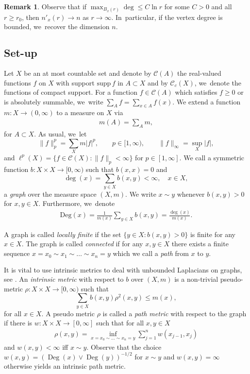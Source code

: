 \documentclass[JEP,XML,SOM,Unicode,published]{cedram}
\theoremstyle{plain}
\theoremstyle{definition}
\newtheorem*{remark}{Remark}
\newcommand{\cC}{\mathcal{C}}
\DeclareMathOperator{\Deg}{Deg}
\begin{document}
\begin{remark}
Observe that if $\max_{B_x(r)}\deg\leq C\ln r$ for some $C>0$ and all $r\geq r_0$, then $n'_x(r)\to n$ as $r\to\infty$. In~particular, if the vertex degree is bounded, we~recover the dimension $n$.
\end{remark}

\subsection{Set-up}\label{subsec:setup}

Let $X$ be an at most countable set and denote by $ \mathcal{C}(A) $ the real-valued functions $ f $ on $ X $ with support $ \mathrm{supp}\, f $ in $ A \subset X $ and by $ \mathcal{C}_{c}(X) $, we~denote the functions of compact support. {For a function $ f\in \mathcal{C}(A) $ which satisfies $ f\ge 0 $ or is absolutely summable, we~write $ \sum_{A}f=\sum_{x\in A}f(x) $.}
We extend a function
$m\colon X\to(0,\infty)$ to a measure on $X$ via \begin{align*}
m(A)=\sum_{A}m,
\end{align*} for $A\subset X$. {As usual, we~let
\[
\|f\|_p^p= {\sum_{X}m|f|^p},\qquad p\in[1,\infty),\qquad \|f\|_\infty=\sup_X|f|,
\]
and $\ell^p(X)=\{f\in \cC(X)\colon \|f\|_p<\infty\}$ for $p\in[1,\infty]$.}
We call a symmetric function $b\colon X\times X\to [0,\infty)$ such that $b(x,x)=0$ and
\[
\deg(x)=\sum_{y\in X}b(x,y)<\infty, \quad x\in X,
\]
a \emph{graph} over the measure space $(X,m)$. {We write $ x\sim y $ whenever $ b(x,y)>0 $ for $ x,y\in X $.} Furthermore, we~denote
\begin{align*}
\mathrm{Deg}(x)=\frac{1}{m(x)}\sum_{y\in X}b(x,y)=\frac{\deg(x)}{m(x)}.
\end{align*}

A graph is called \emph{locally finite} if the set $\{y\in X\colon b(x,y)>0\}$ is finite for any $x\in X$. The graph is called \emph{connected} if for any $x,y\in X$ there exists a finite sequence {$x=x_0\sim x_1\sim \ldots\sim x_n=y$ which we call a \emph{path} from $ x $ to $ y $.}

It is vital to use intrinsic metrics to deal with unbounded Laplacians on graphs, see \cite{Davies-93a,Folz-11,GrigoryanHuangMasamune-12,BauerKH-13, HaeselerKW-13, Folz-14b, Folz-14, BauerKW-15,Keller-15, HuangKS-20, KellerLW-21}.
An \emph{intrinsic metric} with respect to $b$ over $(X,m)$ is a non-trivial pseudo-metric $\rho\colon X\times X\to[0,\infty)$ such that
\[
\sum_{y\in X} b(x,y)\rho^2(x,y)\leq m(x),
\]
for all $ x\in X $.
A pseudo metric $ \rho $ is called a \emph{path metric} with {respect to the graph} if there is $ w: X\times X\to [0,\infty] $ such that for all $ x,y\in X $
\begin{align*}
\rho (x,y)=\inf_{x=x_{0}\sim \ldots\sim x_{n}=y}\sum_{j=1}^{n}w(x_{j-1},x_{j})
\end{align*}
{and $w(x,y)<\infty $ iff $ x\sim y $.}
Observe that the choice $ w(x,y)=(\Deg(x)\vee\Deg(y))^{-1/2} $ for $ x\sim y $ and $ w(x,y) =\infty$ otherwise yields an intrinsic path metric.
\end{document}
